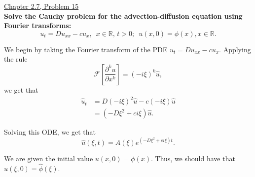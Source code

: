 \documentclass[11pt]{article}
\begin{document}
\newpage


\underline{Chapter 2.7, Problem 15} \\

\textbf{Solve the Cauchy problem for the advection-diffusion equation using Fourier transforms:}
\[u_t = Du_{xx} - cu_x, \, \, \, x \in \mathbb{R}, \, t>0; \, \, \, u(x,0)=\phi(x), x\in\mathbb{R}.\]

We begin by taking the Fourier transform of the PDE $u_t = Du_{xx} - cu_x.$ Applying the rule \[\mathcal{F}\left[ \frac{\partial^k u}{\partial x^k}\right] = (-i\xi)^k \hat{u},\] we get that
\begin{align*} \hat{u}_t &= D(-i\xi)^2 \hat{u} - c(-i\xi) \hat{u} \\
&= (-D\xi^2 + ci\xi) \hat{u}.\end{align*}

Solving this ODE, we get that \[\hat{u}(\xi, t) = A(\xi)e^{(-D\xi^2 + ci\xi)t}.\]

We are given the initial value $u(x, 0) = \phi(x)$. Thus, we should have that $\hat{u}(\xi, 0) = \hat{\phi}(\xi).$
\end{document}
